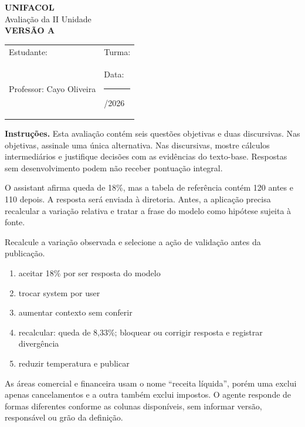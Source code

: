 \documentclass[12pt,a4paper]{article}
\begin{document}
\begin{center}
{\Large\bfseries UNIFACOL}\\[2mm]
{\large Avaliação da II Unidade}\\[1mm]
{\Large\bfseries VERSÃO A}
\end{center}
\begin{DocumentBox}[Identificação]
\begin{tabularx}{\textwidth}{@{}p{}p{}@{}}
Estudante: \hrulefill & Turma: \hrulefill\\[3mm]
Professor: Cayo Oliveira & Data: \rule{2.7cm}{.2pt}/2026
\end{tabularx}
\end{DocumentBox}
\textbf{Instruções.} Esta avaliação contém seis questões objetivas e duas discursivas. Nas objetivas, assinale uma única alternativa. Nas discursivas, mostre cálculos intermediários e justifique decisões com as evidências do texto-base. Respostas sem desenvolvimento podem não receber pontuação integral.
\bigskip

\TextoBase

O assistant afirma queda de 18\%, mas a tabela de referência contém 120 antes e 110 depois. A resposta será enviada à diretoria. Antes, a aplicação precisa recalcular a variação relativa e tratar a frase do modelo como hipótese sujeita à fonte.

\FonteDidatica

\Comando Recalcule a variação observada e selecione a ação de validação antes da publicação.

\begin{enumerate}[label=\Alph*)]
  \item aceitar 18\% por ser resposta do modelo
  \item trocar system por user
  \item aumentar contexto sem conferir
  \item recalcular: queda de 8,33\%; bloquear ou corrigir resposta e registrar divergência
  \item reduzir temperatura e publicar
\end{enumerate}


\TextoBase

As áreas comercial e financeira usam o nome ``receita líquida'', porém uma exclui apenas cancelamentos e a outra também exclui impostos. O agente responde de formas diferentes conforme as colunas disponíveis, sem informar versão, responsável ou grão da definição.
\end{document}
